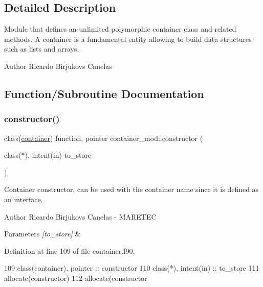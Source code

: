 \subsection{Detailed Description}
Module that defines an unlimited polymorphic container class and related methods. A container is a fundamental entity allowing to build data structures such as lists and arrays. 

\begin{DoxyAuthor}{Author}
Ricardo Birjukovs Canelas 
\end{DoxyAuthor}


\subsection{Function/\+Subroutine Documentation}
\mbox{\label{namespacecontainer__mod_a6262df4ff34024d566cf8261dc20a248}} 
\subsubsection{\texorpdfstring{constructor()}{constructor()}}
{\footnotesize\ttfamily class(\mbox{\hyperlink{structcontainer__mod_1_1container}{container}}) function, pointer container\+\_\+mod\+::constructor (\begin{DoxyParamCaption}\item[{class($\ast$), intent(in)}]{to\+\_\+store }\end{DoxyParamCaption})\hspace{0.3cm}{\ttfamily [private]}}



Container constructor, can be used with the \textquotesingle{}container\textquotesingle{} name since it is defined as an interface. 

\begin{DoxyAuthor}{Author}
Ricardo Birjukovs Canelas -\/ M\+A\+R\+E\+T\+EC 
\end{DoxyAuthor}

\begin{DoxyParams}{Parameters}
{\em \mbox{[}to\+\_\+store\mbox{]}} & \\
\hline
\end{DoxyParams}


Definition at line 109 of file container.\+f90.


\begin{DoxyCode}
109     \textcolor{keywordtype}{class}(container), \textcolor{keywordtype}{pointer} :: constructor
110     \textcolor{keywordtype}{class}(*), \textcolor{keywordtype}{intent(in)} :: to\_store
111     \textcolor{keyword}{allocate}(constructor)
112     \textcolor{keyword}{allocate}(constructor%
\end{DoxyCode}
\mbox{\label{namespacecontainer__mod_a23a016e747d896622127c0c21dca9836}} 
